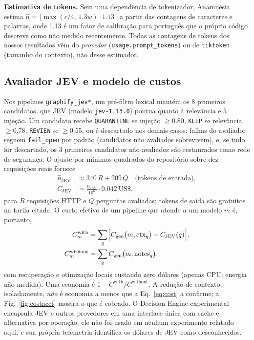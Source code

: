 \documentclass[conference,onecolumn,11pt]{IEEEtran}
\newcommand{\anam}{Anam\-n\'esia}
\begin{document}
\textbf{Estimativa de tokens.} Sem uma dependência de tokenizador, \anam{} estima $\hat n=\lceil \max(c/4,\,1.3w)\cdot 1.13\rceil$ a partir das contagens de caracteres e palavras, onde 1.13 é um fator de calibração para português que o próprio código descreve como não medido recentemente. Todas as contagens de tokens dos nossos resultados vêm do \emph{provedor} (\texttt{usage.prompt\_tokens}) ou de \texttt{tiktoken} (tamanho do contexto), não desse estimador.

\subsection{Avaliador JEV e modelo de custos}\label{sec:cost}
Nos pipelines \texttt{graphify\_jev*}, um pré-filtro lexical mantém os 8 primeiros candidatos, que JEV (modelo \texttt{jev-1.13.0}) pontua quanto à relevância e à injeção. Um candidato recebe \texttt{QUARANTINE} se injeção $\ge0.80$, \texttt{KEEP} se relevância $\ge0.78$, \texttt{REVIEW} se $\ge0.55$, ou é descartado nos demais casos; falhas do avaliador seguem \texttt{fail\_open} por padrão (candidatos não avaliados sobrevivem), e, se tudo for descartado, os 3 primeiros candidatos não avaliados são restaurados como rede de segurança. O ajuste por mínimos quadrados do repositório sobre dez requisições reais fornece
\begin{equation}
\begin{aligned}
\hat n_{\mathrm{JEV}}&\approx 340\,R+209\,Q\quad\text{(tokens de entrada)},\\
C_{\mathrm{JEV}}&=\frac{n_{\mathrm{JEV}}}{10^{6}}\cdot 0.042\ \text{US\$},
\end{aligned}\label{eq:jev}
\end{equation}
para $R$ requisições HTTP e $Q$ perguntas avaliadas; tokens de saída são gratuitos na tarifa citada. O custo efetivo de um pipeline que atende a um modelo $m$ é, portanto,
\begin{equation}
\begin{aligned}
C^{\text{with}}_m&=\sum_{q}\Bigl[C_{\mathrm{gen}}\bigl(m,\mathrm{ctx}_q\bigr)+C_{\mathrm{JEV}}(q)\Bigr],\\
C^{\text{without}}_m&=\sum_{q}C_{\mathrm{gen}}\bigl(m,\mathrm{notes}_q\bigr),
\end{aligned}\label{eq:cost}
\end{equation}
com recuperação e otimização locais custando zero dólares (apenas CPU; energia não medida). Uma economia é $1-C^{\text{with}}/C^{\text{without}}$. A redução de contexto, isoladamente, \emph{não} é economia a menos que a Eq.~\eqref{eq:cost} a confirme; a Fig.~\ref{fig:costacct} mostra o que é cobrado. O Decision Engine experimental encapsula JEV e outros provedores em uma interface única com cache e alternativa por operação; ele não foi usado em nenhum experimento relatado aqui, e sua própria telemetria identifica os dólares de JEV como desconhecidos.
\end{document}
